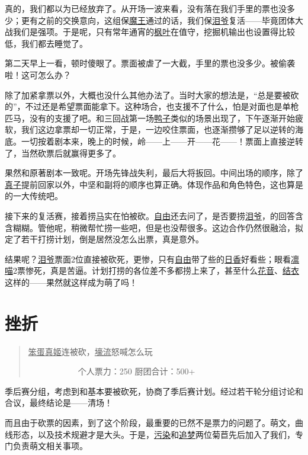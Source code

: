 真的，我们都以为已经放弃了。从开场一波来看，没有落在我们手里的票也没多少；更有之前的交换意向，这组保\uline{魔王}通过的话，我们保\uline{泪爷}复活——毕竟团体大战我们是强项。于是呢，只有常年通宵的\uline{枫叶}在值守，挖掘机输出也设置得比较低，我们都去睡觉了。

第二天早上一看，顿时傻眼了。票面被虐了一大截，手里的票也没多少。被偷袭啦！这可怎么办？

除了加紧拿票以外，大概也没什么其他办法了。当时大家的想法是，“总是要被砍的”，不过还是希望票面能拿下。这种场合，也支援不了什么，怕是对面也是单枪匹马，没有的支援了吧。和三回战第一场\uline{鸭子}类似的场景出现了，下午逐渐开始疲软，我们这边拿票却一切正常，于是，一边咬住票面，也逐渐攒够了足以逆转的海底。一切按着剧本来，晚上的时候，岭——上——开——花——！票面上直接逆转了，当然砍票后就赢得更多了。

果然和原著剧本一致呢。开场先锋战失利，最后大将扳回。中间出场的顺序，除了\uline{真子}提前回家以外，中坚和副将的顺序也算正确。体现作品和角色特色，这也算是的一大传统吧。

接下来的复活赛，接着捞\uline{马}实在怕被砍。\uline{自由}还去问了，是否要捞\uline{\uline{泪爷}}，的回答含含糊糊。管他呢，稍微帮忙捞一些吧，但是也没帮很多。这边合作仍然很融洽，拟定了若干打捞计划，倒是居然没怎么出票，真是意外。

结果呢？\uline{泪爷}票面2位直接被砍死，更惨，只有\uline{自由}带了些的\uline{日香}好看些；眼看\uline{凛喵}2票惨死，真是苦逼。计划打捞的各位差不多都捞上来了，甚至什么\uline{花音}、\uline{结衣}这样的——果然就这样成为萌了吗！

\chapter{挫折}
\begin{quote}
\uline{笨蛋}\uline{真姬}连被砍，\uline{壕流}怒喊怎么玩

　　　　　　个人票力：250 厨团合计：500+
\end{quote}

季后赛分组，考虑到和基本要被砍死，协商了季后赛计划。经过若干轮分组讨论和合议，最终结论是——清场！

而且由于砍票的因素，到了这个阶段，最重要的已然不是票力的问题了。萌文，曲线形态，以及技术规避才是大头。于是，\uline{污染}和\uline{追梦}两位菊苣先后加入了我们，专门负责萌文相关事项。

